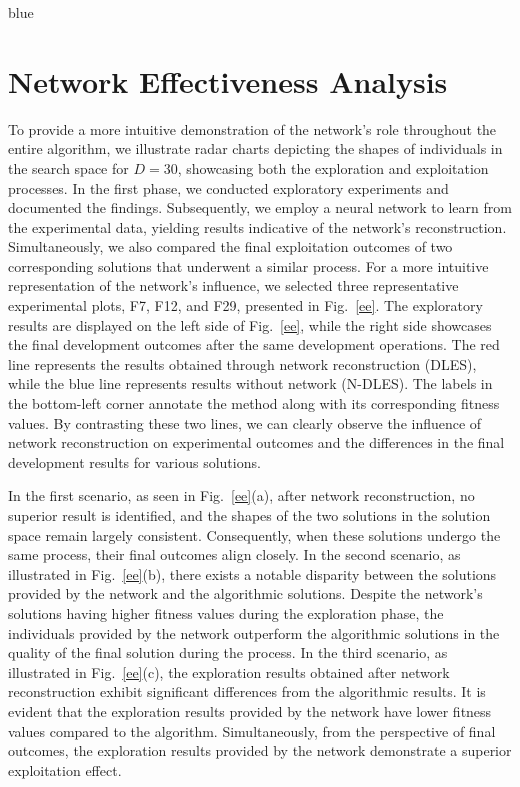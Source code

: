 \documentclass[journal, onecolumn]{IEEEtran}
\begin{document}
\begin{color}{blue}
\section{Network Effectiveness Analysis} \label{net-a}
To provide a more intuitive demonstration of the network's role throughout the entire algorithm, we illustrate radar charts depicting the shapes of individuals in the search space for $D = 30$, showcasing both the exploration and exploitation processes. In the first phase, we conducted exploratory experiments and documented the findings. Subsequently, we employ a neural network to learn from the experimental data, yielding results indicative of the network's reconstruction. Simultaneously, we also compared the final exploitation outcomes of two corresponding solutions that underwent a similar process. For a more intuitive representation of the network's influence, we selected three representative experimental plots, F7, F12, and F29, presented in Fig.~\ref{ee}. The exploratory results are displayed on the left side of Fig.~\ref{ee}, while the right side showcases the final development outcomes after the same development operations. The red line represents the results obtained through network reconstruction (DLES), while the blue line represents results without network (N-DLES). The labels in the bottom-left corner annotate the method along with its corresponding fitness values. By contrasting these two lines, we can clearly observe the influence of network reconstruction on experimental outcomes and the differences in the final development results for various solutions.

In the first scenario, as seen in Fig.~\ref{ee}(a), after network reconstruction, no superior result is identified, and the shapes of the two solutions in the solution space remain largely consistent. Consequently, when these solutions undergo the same process, their final outcomes align closely. In the second scenario, as illustrated in Fig.~\ref{ee}(b), there exists a notable disparity between the solutions provided by the network and the algorithmic solutions. Despite the network's solutions having higher fitness values during the exploration phase, the individuals provided by the network outperform the algorithmic solutions in the quality of the final solution during the process. In the third scenario, as illustrated in Fig.~\ref{ee}(c), the exploration results obtained after network reconstruction exhibit significant differences from the algorithmic results. It is evident that the exploration results provided by the network have lower fitness values compared to the algorithm. Simultaneously, from the perspective of final outcomes, the exploration results provided by the network demonstrate a superior exploitation effect. 


\end{color}
\end{document}
